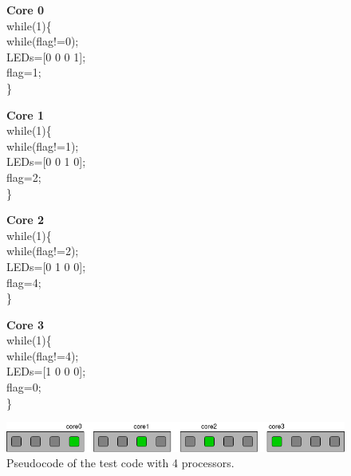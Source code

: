\begin{figure}[htbp]
\centering
\begin{minipage}[t][3cm][t]{3.2cm}
\textbf{Core 0}\\
while(1)\{\\
\hspace*{.4cm}while(flag!=0);\\
\hspace*{.4cm}LEDs=[0 0 0 1];\\
\hspace*{.4cm}flag=1;\\
\}
\end{minipage}\hspace{.5cm}
\begin{minipage}[t][3cm][t]{3.2cm}
\textbf{Core 1}\\
while(1)\{\\
\hspace*{.4cm}while(flag!=1);\\
\hspace*{.4cm}LEDs=[0 0 1 0];\\
\hspace*{.4cm}flag=2;\\
\}
\end{minipage}\hspace{.5cm}
\begin{minipage}[t][3cm][t]{3.2cm}
\textbf{Core 2}\\
while(1)\{\\
\hspace*{.4cm}while(flag!=2);\\
\hspace*{.4cm}LEDs=[0 1 0 0];\\
\hspace*{.4cm}flag=4;\\
\}
\end{minipage}\hspace{.5cm}
\begin{minipage}[t][3cm][t]{3.2cm}
\textbf{Core 3}\\
while(1)\{\\
\hspace*{.4cm}while(flag!=4);\\
\hspace*{.4cm}LEDs=[1 0 0 0];\\
\hspace*{.4cm}flag=0;\\
\}
\end{minipage}
\includegraphics[width=.72\textwidth]{images/LEDs4_fig.png}
\caption{Pseudocode of the test code with 4 processors.}
\label{4LED-code}
\end{figure}

